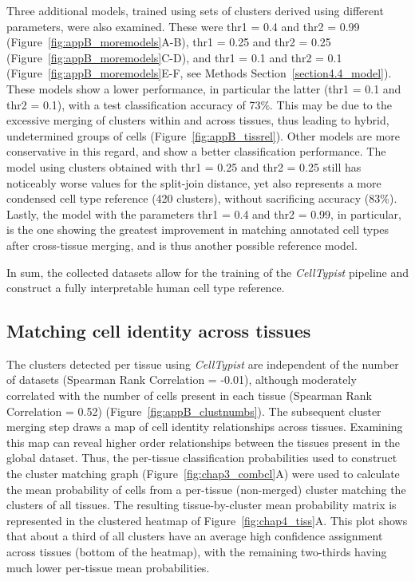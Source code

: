 Three additional models, trained using sets of clusters derived using different parameters, were also examined. These were thr1 = 0.4 and thr2 = 0.99 (Figure~\ref{fig:appB_moremodels}A-B), thr1 = 0.25 and thr2 = 0.25 (Figure~\ref{fig:appB_moremodels}C-D), and thr1 = 0.1 and thr2 = 0.1 (Figure~\ref{fig:appB_moremodels}E-F, see Methods Section~\ref{section4.4_model}). These models show a lower performance, in particular the latter (thr1 = 0.1 and thr2 = 0.1), with a test classification accuracy of 73\%. This may be due to the excessive merging of clusters within and across tissues, thus leading to hybrid, undetermined groups of cells (Figure~\ref{fig:appB_tissrel}). Other models are more conservative in this regard, and show a better classification performance. The model using clusters obtained with thr1 = 0.25 and thr2 = 0.25 still has noticeably worse values for the split-join distance, yet also represents a more condensed cell type reference (420 clusters), without sacrificing accuracy (83\%). Lastly, the model with the parameters thr1 = 0.4 and thr2 = 0.99, in particular, is the one showing the greatest improvement in matching annotated cell types after cross-tissue merging, and is thus another possible reference model.

In sum, the collected datasets allow for the training of the \textit{CellTypist} pipeline and construct a fully interpretable human cell type reference.


\subsection{Matching cell identity across tissues}
\label{section_tissues}
The clusters detected per tissue using \textit{CellTypist} are independent of the number of datasets (Spearman Rank Correlation = -0.01), although moderately correlated with the number of cells present in each tissue (Spearman Rank Correlation = 0.52) (Figure~\ref{fig:appB_clustnumbs}). The subsequent cluster merging step draws a map of cell identity relationships across tissues. Examining this map can reveal higher order relationships between the tissues present in the global dataset. Thus, the per-tissue classification probabilities used to construct the cluster matching graph (Figure~\ref{fig:chap3_combcl}A) were used to calculate the mean probability of cells from a per-tissue (non-merged) cluster matching the clusters of all tissues. The resulting tissue-by-cluster mean probability matrix is represented in the clustered heatmap of Figure~\ref{fig:chap4_tiss}A. This plot shows that about a third of all clusters have an average high confidence assignment across tissues (bottom of the heatmap), with the remaining two-thirds having much lower per-tissue mean probabilities. 

